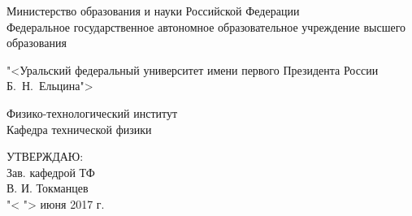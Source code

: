 \begin{titlepage}
\begin{center}

	\begin{normalsize}
		{
			\noindent Министерство образования и науки Российской Федерации\\
			\noindent Федеральное государственное автономное образовательное учреждение высшего образования\\
		}
	\end{normalsize}

	\par \vspace{0.2cm}
	
	{

		\noindent "<Уральский федеральный университет имени первого Президента России Б.~Н.~Ельцина">\\
	}
	\noindent Физико-технологический институт \\
	\noindent Кафедра технической физики \\

	\par \vspace{1cm}

	\hfill\begin{minipage}{.45\textwidth}
		\begin{large}
			\begin{raggedleft}
				УТВЕРЖДАЮ: \\
				Зав. кафедрой ТФ \\
				\underline{\hspace{2cm}} В. И. Токманцев \\
				"< \underline{\hspace{1cm}} "> июня 2017 г. \\
			\end{raggedleft}
		\end{large}
	\end{minipage}


\end{center}
\end{titlepage}
